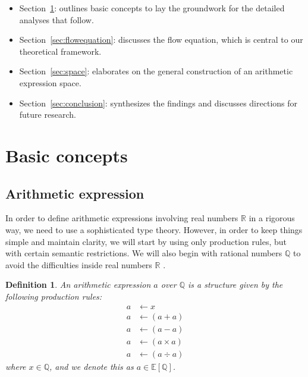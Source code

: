 \documentclass{article}
\newtheorem{definition}{Definition}
\numberwithin{definition}{section}
\numberwithin{lemma}{section}
\numberwithin{proposition}{section}
\numberwithin{corollary}{section}
\numberwithin{theorem}{section}
\begin{document}
\begin{itemize}
    \item Section~\ref{sec:concepts}: outlines basic concepts to lay the groundwork for the detailed analyses that follow.
    \item Section~\ref{sec:flowequation}: discusses the flow equation, which is central to our theoretical framework.
    \item Section~\ref{sec:space}: elaborates on the general construction of an arithmetic expression space.
    \item Section~\ref{sec:conclusion}: synthesizes the findings and discusses directions for future research.
\end{itemize}

\section{Basic concepts}\label{sec:concepts}

\subsection{Arithmetic expression}\label{sec:expression}

In order to define arithmetic expressions involving real numbers  $\mathbb{R}$ in a rigorous way, we need to use a sophisticated type theory. However, in order to keep things simple and maintain clarity, we will start by using only production rules, but with certain semantic restrictions. We will also begin with rational numbers $\mathbb{Q}$ to avoid the difficulties inside real numbers $\mathbb{R}$ .

\begin{definition}\label{def:arithmetic-expression}
An arithmetic expression $a$ over $\mathbb{Q}$ is a structure given by the following production rules:
\begin{equation}\label{eq:productionrule}
\begin{aligned}
    a &\longleftarrow x\\
    a &\longleftarrow ( a + a )\\
    a &\longleftarrow ( a - a )\\
    a &\longleftarrow ( a \times a )\\
    a &\longleftarrow ( a \div a )
\end{aligned}
\end{equation}
where $x \in \mathbb{Q}$, and we denote this as $a \in \mathbb{E} \left [\mathbb{Q} \right ]$.
\end{definition}
\end{document}
